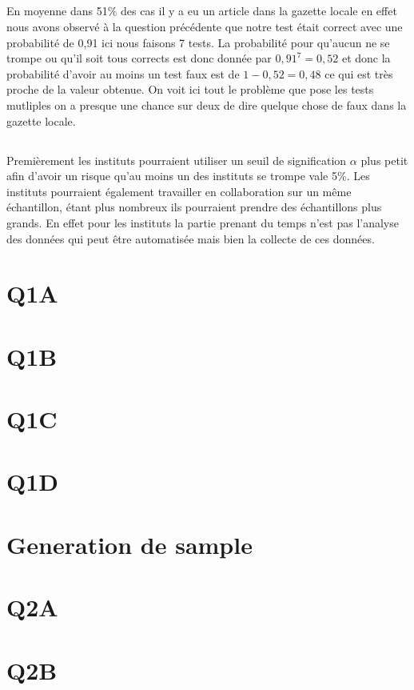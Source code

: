 \documentclass[a4paper, 11pt]{article}
\begin{document}
\subsection{}
En moyenne dans 51\% des cas il y a eu un article dans la gazette locale en effet nous avons observé à la question précédente que notre test était correct avec une probabilité de 0,91 ici nous faisons 7 tests. La probabilité pour qu'aucun ne se trompe ou qu'il soit tous corrects est donc donnée par $0,91^7 = 0,52$ et donc la probabilité d'avoir au moins un test faux est de $1 - 0,52 = 0,48$ ce qui est très proche de la valeur obtenue. On voit ici tout le problème que pose les tests mutliples on a presque une chance sur deux de dire quelque chose de faux dans la gazette locale.
\subsection{}
Premièrement les instituts pourraient utiliser un seuil de signification $\alpha$ plus petit afin d'avoir un risque qu'au moins un des instituts se trompe vale 5\%. Les instituts pourraient également travailler en collaboration sur un même échantillon, étant plus nombreux ils pourraient prendre des échantillons plus grands. En effet pour les instituts la partie prenant du temps n'est pas l'analyse des données qui peut être automatisée mais bien la collecte de ces données.

\newpage
\appendix
\section{Q1A}
\lstset{breaklines=true}


\section{Q1B}


\section{Q1C}

\section{Q1D}

\section{Generation de sample}

\section{Q2A}

\section{Q2B}

\end{document}
